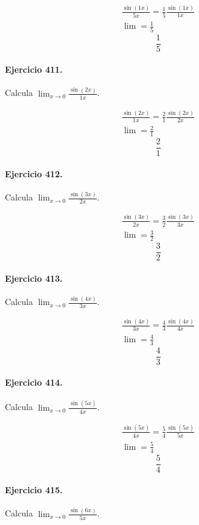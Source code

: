 \documentclass[11pt,a4paper]{article}
\begin{document}
\[
\begin{aligned}
\frac{\sin(1x)}{5x}=\frac{1}{5}\frac{\sin(1x)}{1x}\\
\lim=\frac{1}{5}
\end{aligned}
\]
\[\boxed{\frac{1}{5}}\]


\paragraph{Ejercicio 411.} Calcula $\displaystyle\lim_{x\to0}\frac{\sin(2x)}{1x}$.

\[
\begin{aligned}
\frac{\sin(2x)}{1x}=\frac{2}{1}\frac{\sin(2x)}{2x}\\
\lim=\frac{2}{1}
\end{aligned}
\]
\[\boxed{\frac{2}{1}}\]


\paragraph{Ejercicio 412.} Calcula $\displaystyle\lim_{x\to0}\frac{\sin(3x)}{2x}$.

\[
\begin{aligned}
\frac{\sin(3x)}{2x}=\frac{3}{2}\frac{\sin(3x)}{3x}\\
\lim=\frac{3}{2}
\end{aligned}
\]
\[\boxed{\frac{3}{2}}\]


\paragraph{Ejercicio 413.} Calcula $\displaystyle\lim_{x\to0}\frac{\sin(4x)}{3x}$.

\[
\begin{aligned}
\frac{\sin(4x)}{3x}=\frac{4}{3}\frac{\sin(4x)}{4x}\\
\lim=\frac{4}{3}
\end{aligned}
\]
\[\boxed{\frac{4}{3}}\]


\paragraph{Ejercicio 414.} Calcula $\displaystyle\lim_{x\to0}\frac{\sin(5x)}{4x}$.

\[
\begin{aligned}
\frac{\sin(5x)}{4x}=\frac{5}{4}\frac{\sin(5x)}{5x}\\
\lim=\frac{5}{4}
\end{aligned}
\]
\[\boxed{\frac{5}{4}}\]


\paragraph{Ejercicio 415.} Calcula $\displaystyle\lim_{x\to0}\frac{\sin(6x)}{5x}$.
\end{document}
